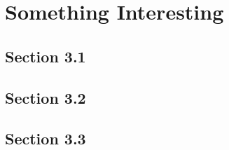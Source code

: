 

\chapter{Something Interesting}\label{chap:3}

\lipsum[1] %

\section{Section 3.1}\label{section3.1}

\lipsum[1-2]

\section{Section 3.2}\label{section3.2}

\lipsum[1-2]

\section{Section 3.3}\label{section3.3}

\lipsum[1-2]
